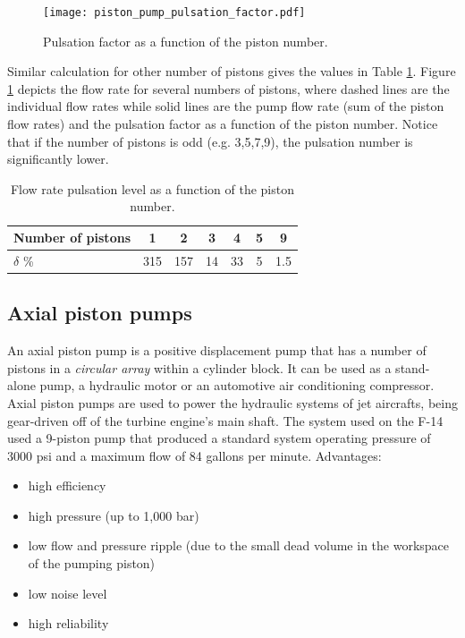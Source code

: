 \begin{figure}[ht]
\begin{center}
\texttt{[image: piston\_pump\_pulsation\_factor.pdf]}
\caption{\label{fig:pulsation_factor}Pulsation factor as a function of the piston number.}
\end{center}
\end{figure}

Similar calculation for other number of pistons gives the values in Table \ref{tab:piston_puls}. Figure \ref{fig:pulsation_factor} depicts the flow rate for several numbers of pistons, where dashed lines are the individual flow rates while solid lines are the pump flow rate (sum of the piston flow rates) and the pulsation factor as a function of the piston number. Notice that if the number of pistons is odd (e.g. 3,5,7,9), the pulsation number is significantly lower.

\begin{table}[h]
\centering
\begin{tabular}{l||c|c|c|c|c|c|}
Number of pistons & 1 & 2 & 3 & 4 & 5 & 9\\ \hline
$\delta $ \%      &  315 & 157 & 14 & 33 & 5 & 1.5
\end{tabular}
\caption{\label{tab:piston_puls}Flow rate pulsation level as a function of the piston number.}
\end{table}
\clearpage

\subsection{Axial piston pumps}

An axial piston pump is a positive displacement pump that has a number of pistons in a \emph{circular array} within a cylinder block. It can be used as a stand-alone pump, a hydraulic motor or an automotive air conditioning compressor. Axial piston pumps are used to power the hydraulic systems of jet aircrafts, being gear-driven off of the turbine engine's main shaft. The system used on the F-14 used a 9-piston pump that produced a standard system operating pressure of 3000 psi and a maximum flow of 84 gallons per minute.  Advantages:

\begin{itemize}
\item high efficiency
\item  high pressure (up to 1,000 bar)
\item  low flow and pressure ripple (due to the small dead volume in the workspace of the pumping piston)
\item low noise level
\item high reliability
\end{itemize}


